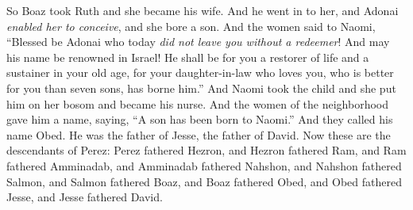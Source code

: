 \begin{biblechapter}
 So Boaz took Ruth and she became his wife. And he went in to her, and Adonai \textit{enabled her to conceive}, and she bore a son.
\verse And the women said to Naomi, “Blessed be Adonai who today \textit{did not leave you without a redeemer}! And may his name be renowned in Israel!
\verse He shall be for you a restorer of life and a sustainer in your old age, for your daughter-in-law who loves you, who is better for you than seven sons, has borne him.”
\verse And Naomi took the child and she put him on her bosom and became his nurse.
\verse And the women of the neighborhood gave him a name, saying, “A son has been born to Naomi.” And they called his name Obed. He was the father of Jesse, the father of David.
\verse Now these are the descendants of Perez: Perez fathered Hezron,
\verse and Hezron fathered Ram, and Ram fathered Amminadab,
\verse and Amminadab fathered Nahshon, and Nahshon fathered Salmon,
\verse and Salmon fathered Boaz, and Boaz fathered Obed,
\verse and Obed fathered Jesse, and Jesse fathered David.
\end{biblechapter}


